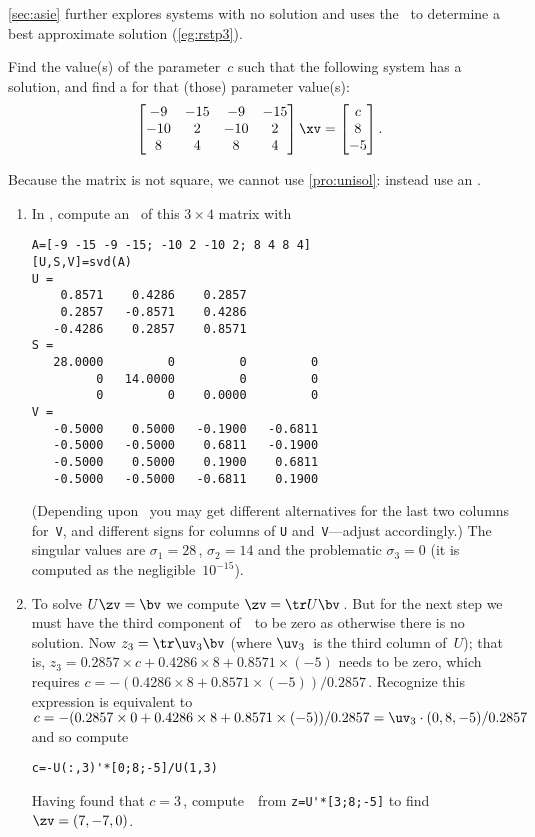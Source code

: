 \cref{sec:asie} further explores systems with no solution and uses the \svd\ to determine a best approximate solution (\cref{eg:rstp3}).



\begin{example} \label{eg:3x4findc}
Find the value(s) of the parameter~\(c\) such that the following system has a solution, and find a  for that (those) parameter value(s):
\begin{equation*}
\begin{bmatrix} -9&-15&-9&-15
\\-10&2&-10&2
\\8&4&8&4 \end{bmatrix}\xv=
\begin{bmatrix} c\\8\\-5 \end{bmatrix}.
\end{equation*}
\begin{solution} 
Because the matrix is not square, we cannot use \cref{pro:unisol}: instead use an \svd.
\begin{enumerate}
\item In \script, compute an \svd\  of this \(3\times 4\) matrix with 
\setbox\ajrqrbox\hbox{}%
\marginajrbox%
\begin{verbatim}
A=[-9 -15 -9 -15; -10 2 -10 2; 8 4 8 4]
[U,S,V]=svd(A)
U =
    0.8571    0.4286    0.2857
    0.2857   -0.8571    0.4286
   -0.4286    0.2857    0.8571
S =
   28.0000         0         0         0
         0   14.0000         0         0
         0         0    0.0000         0
V =
   -0.5000    0.5000   -0.1900   -0.6811
   -0.5000   -0.5000    0.6811   -0.1900
   -0.5000    0.5000    0.1900    0.6811
   -0.5000   -0.5000   -0.6811    0.1900
\end{verbatim}
(Depending upon \script\ you may get different alternatives for the last two columns for~\texttt{V}, and different signs for columns of \texttt{U} and~\texttt{V}---adjust accordingly.)
The singular values are \(\sigma_1=28\)\,, \(\sigma_2=14\) and the problematic \(\sigma_3=0\) (it is computed as the negligible~\(10^{-15}\)).

\item To solve \(U\zv=\bv\) we compute \(\zv=\tr U\bv\)\,.  
But for the next step we must have the third component of~\zv\ to be zero as otherwise there is no solution.  
Now \(z_3=\tr\uv_3\bv\) (where \(\uv_3\)~is the third column of~\(U\)); that is, \(z_3=0.2857\times c +0.4286\times8 +0.8571\times(-5)\) needs to be zero, which requires \(c=-(0.4286\times8 +0.8571\times(-5))/0.2857\)\,.  
Recognize this expression is equivalent to \(c=-(0.2857\times0+0.4286\times8 +0.8571\times(-5))/0.2857=\uv_3\cdot(0,8,-5)/0.2857\) and so compute
\begin{verbatim}
c=-U(:,3)'*[0;8;-5]/U(1,3)
\end{verbatim}
Having found that \(c=3\)\,, compute~\zv\ from \verb|z=U'*[3;8;-5]| to find \(\zv=(7,-7,0)\).


\end{enumerate}
\end{solution}
\end{example}
